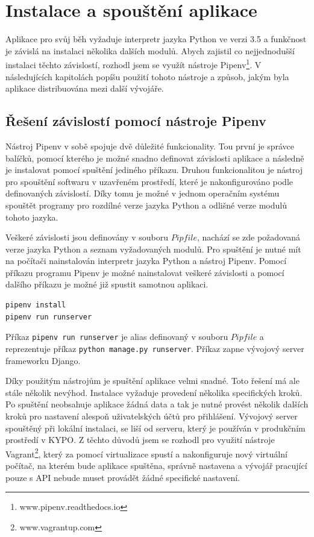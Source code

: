 \documentclass[
  digital, %
  twoside, %
  table,   %
  lof,     %
  lot,     %
]{fithesis3}
\begin{document}
\section{Instalace a spouštění aplikace}
Aplikace pro svůj běh vyžaduje interpretr jazyka Python ve verzi 3.5 a funkčnost je závislá na instalaci několika dalších modulů. Abych zajistil co nejjednodušší instalaci těchto závislostí, rozhodl jsem se využít nástroje Pipenv\footnote{www.pipenv.readthedocs.io}. V následujících kapitolách popíšu použití tohoto nástroje a způsob, jakým byla aplikace distribuována mezi další vývojáře.

\subsection{Řešení závislostí pomocí nástroje Pipenv}
Nástroj Pipenv v sobě spojuje dvě důležité funkcionality. Tou první je správce balíčků, pomocí kterého je možné snadno definovat závislosti aplikace a následně je instalovat pomocí spuštění jediného příkazu. Druhou funkcionalitou je nástroj pro spouštění softwaru v uzavřeném prostředí, které je nakonfigurováno podle definovaných závislostí. Díky tomu je možné v jednom operačním systému spouštět programy pro rozdílné verze jazyka Python a odlišné verze modulů tohoto jazyka.

Veškeré závislosti jsou definovány v souboru $Pipfile$, nachází se zde požadovaná verze jazyka Python a seznam vyžadovaných modulů. Pro spuštění je nutné mít na počítači nainstalován interpretr jazyka Python a nástroj Pipenv. Pomocí příkazu programu Pipenv je možné nainstalovat veškeré závislosti a pomocí dalšího příkazu je možné již spustit samotnou aplikaci.

\begin{lstlisting}
pipenv install
pipenv run runserver
\end{lstlisting}

Příkaz \lstinline[columns=fixed]{pipenv run runserver} je alias definovaný v souboru $Pipfile$ a reprezentuje příkaz \lstinline[columns=fixed]{python manage.py runserver}. Příkaz zapne vývojový server frameworku Django.

Díky použitým nástrojům je spuštění aplikace velmi snadné. Toto řešení má ale stále několik nevýhod. Instalace vyžaduje provedení několika specifických kroků. Po spuštění neobsahuje aplikace žádná data a tak je nutné provést několik dalších kroků pro nastavení alespoň uživatelských účtů pro přihlášení. Vývojový server spouštěný při lokální instalaci, se liší od serveru, který je používán v produkčním prostředí v KYPO. Z těchto důvodů jsem se rozhodl pro využití nástroje Vagrant\footnote{www.vagrantup.com}, který za pomocí virtualizace spustí a nakonfiguruje nový virtuální počítač, na kterém bude aplikace spuštěna, správně nastavena a vývojář pracující pouze s API nebude muset provádět žádné specifické nastavení.
\end{document}
